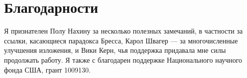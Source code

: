 \chapter*{Благодарности}
Я признателен Полу Нахину за несколько полезных замечаний, в частности за ссылки, касающиеся парадокса Бресса,
Карол Швагер --- за многочисленные улучшения изложения,
и
Вики Керн, чья поддержка придавала мне силы продолжать работу.
Я также с благодарен поддержке Национального научного фонда США, грант 1009130.
